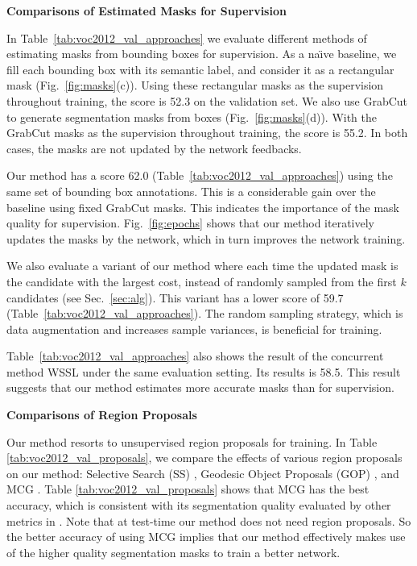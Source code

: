\documentclass[10pt,twocolumn,letterpaper]{article}
\begin{document}
\vspace{8pt}
\noindent\textbf{Comparisons of Estimated Masks for Supervision}

In Table~\ref{tab:voc2012_val_approaches} we evaluate different methods of estimating masks from bounding boxes for supervision. As a na\"{\i}ve baseline, we fill each bounding box with its semantic label, and consider it as a rectangular mask (Fig.~\ref{fig:masks}(c)). Using these rectangular masks as the supervision throughout training, the score is 52.3 on the validation set. We also use GrabCut \cite{rother2004grabcut} to generate segmentation masks from boxes (Fig.~\ref{fig:masks}(d)). With the GrabCut masks as the supervision throughout training, the score is 55.2. In both cases, the masks are not updated by the network feedbacks.

Our method has a score 62.0 (Table~\ref{tab:voc2012_val_approaches}) using the same set of bounding box annotations. This is a considerable gain over the baseline using fixed GrabCut masks. This indicates the importance of the mask quality for supervision. Fig.~\ref{fig:epochs} shows that our method iteratively updates the masks by the network, which in turn improves the network training.

We also evaluate a variant of our method where each time the updated mask is the candidate with the largest cost, instead of randomly sampled from the first $k$ candidates (see Sec.~\ref{sec:alg}). This variant has a lower score of 59.7 (Table~\ref{tab:voc2012_val_approaches}). The random sampling strategy, which is data augmentation and increases sample variances, is beneficial for training.

Table~\ref{tab:voc2012_val_approaches} also shows the result of the concurrent method WSSL \cite{Chen2015} under the same evaluation setting. Its results is 58.5. This result suggests that our method estimates more accurate masks than \cite{Chen2015} for supervision.


\vspace{8pt}
\noindent\textbf{Comparisons of Region Proposals}

Our method resorts to unsupervised region proposals for training.
In Table \ref{tab:voc2012_val_proposals}, we compare the effects of various region proposals on our method: Selective Search (SS) \cite{uijlings2013selective}, Geodesic Object Proposals (GOP) \cite{krahenbuhl2014geodesic}, and MCG \cite{arbelaez2014multiscale}.
Table \ref{tab:voc2012_val_proposals} shows that MCG \cite{arbelaez2014multiscale} has the best accuracy, which is consistent with its segmentation quality evaluated by other metrics in \cite{arbelaez2014multiscale}. Note that at test-time our method does not need region proposals. So the better accuracy of using MCG implies that
our method effectively makes use of the higher quality segmentation masks to train a better network.
\end{document}
